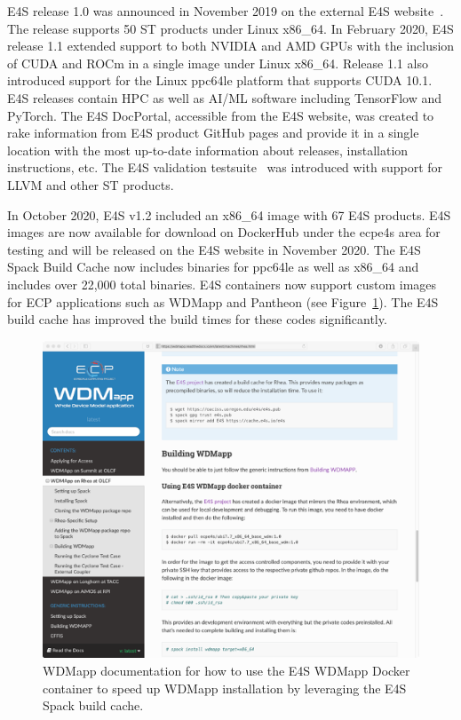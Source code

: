 E4S release 1.0 was announced in November 2019 on the external E4S website~\cite{e4s:homepage}. The release supports 50 ST products under Linux x86\_64. In February 2020, E4S release 1.1 extended support to both NVIDIA and AMD GPUs with the inclusion of CUDA and ROCm in a single image under Linux x86\_64. Release 1.1 also introduced support for the Linux ppc64le platform that supports CUDA 10.1. E4S releases contain HPC as well as AI/ML software including TensorFlow and PyTorch. The E4S DocPortal, accessible from the E4S website, was created to rake information from E4S product GitHub pages and provide it in a single location with the most up-to-date information about releases, installation instructions, etc. The E4S validation testsuite~\cite{e4s:validation} was introduced with support for LLVM and other ST products.

In October 2020, E4S v1.2 included an x86\_64 image with 67 E4S products. E4S images are now available for download on DockerHub under the ecpe4s area for testing and will be released on the E4S website in November 2020. The E4S Spack Build Cache now includes binaries for ppc64le as well as x86\_64 and includes over 22,000 total binaries. E4S containers now support custom images for ECP applications such as WDMapp and Pantheon (see Figure~\ref{fig:SpackBuildCacheWDMapp}). The E4S build cache has improved the build times for these codes significantly. 
\begin{figure}
        \centering
        \includegraphics[width=0.9\linewidth]{projects/2.3.5-Ecosystem/2.3.5.01-Ecosystem-SDK/SpackBuildCacheWDMapp}
        \caption{WDMapp documentation for how to use the E4S WDMapp Docker container to speed up WDMapp installation by leveraging the E4S Spack build cache.}
        \label{fig:SpackBuildCacheWDMapp}
\end{figure}

